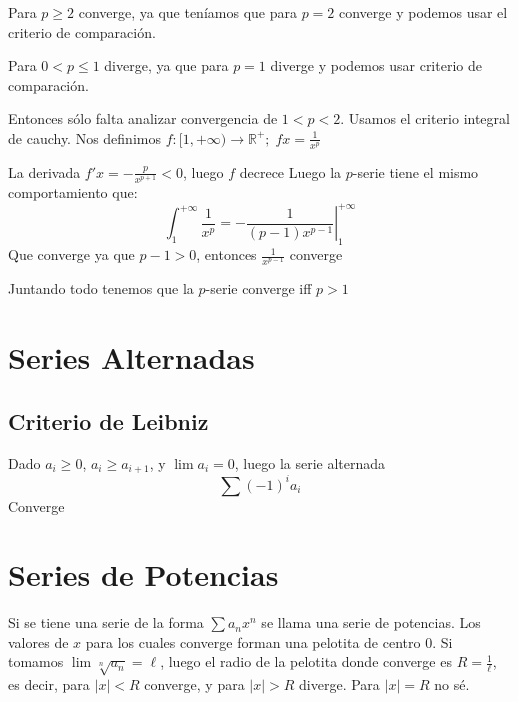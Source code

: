 \documentclass{article}
\def\R{\mathbb{R}}
\begin{document}
Para $p \geq 2$ converge, ya que teníamos que para $p = 2$ converge y
podemos usar el criterio de comparación.

Para $0 < p \leq 1$ diverge, ya que para $p = 1$ diverge y podemos usar
criterio de comparación.

Entonces sólo falta analizar convergencia de $1 < p < 2$.
Usamos el criterio integral de cauchy. Nos definimos $f :
[1, +\infty) \to \R^+; \; fx = \frac{1}{x^p}$

La derivada $f'x = -\frac{p}{x^{p+1}} < 0$, luego $f$ decrece
Luego la $p$-serie tiene el mismo comportamiento que:
\[\int_1^{+\infty} \frac{1}{x^p} = \left.
	-\frac{1}{(p-1)x^{p-1}}\right|_1^{+\infty}
\]
Que converge ya que $p-1 > 0$, entonces $\frac{1}{x^{p-1}}$ converge

Juntando todo tenemos que la $p$-serie converge iff $p > 1$

\section{Series Alternadas}
\subsection{Criterio de Leibniz}
Dado $a_i \geq 0$, $a_i \geq a_{i+1}$, y $\lim a_i = 0$, luego la serie
alternada \[
	\sum (-1)^ia_i
\]
Converge
\section{Series de Potencias}
Si se tiene una serie de la forma $\sum a_nx^n$ se llama una serie de
potencias.
Los valores de $x$ para los cuales converge forman una pelotita de centro
$0$.
Si tomamos $\lim \sqrt[n]{a_n} = \ell$, luego el radio de la pelotita donde
converge es $R = \frac{1}{\ell}$, es decir, para $|x| < R$ converge, y para
$|x| > R$ diverge. Para $|x| = R$ no sé.
\end{document}
